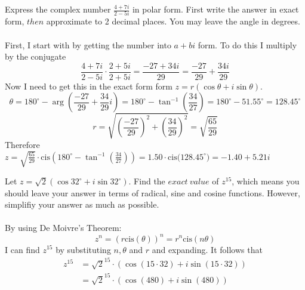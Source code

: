 \documentclass[titlepage]{article}
\newenvironment{problem}[2][Problem]{\begin{trivlist}
\item[\hskip \labelsep {\bfseries #1}\hskip \labelsep {\bfseries #2.}]}{\end{trivlist}}
\begin{document}
 
 
\fancyhf{}
\begin{problem}{1}
Express the complex number $\frac{4+7i}{2-5i}$ in polar form. First write the answer in exact form, $then$ approximate to 2 decimal places. You may leave the angle in degrees.
\\ \\
First, I start with by getting the number into $a + bi$ form.  To do this I multiply by the conjugate
$$\frac{4+7i}{2-5i} \cdot \frac{2+5i}{2+5i} = \frac{-27+34i}{29} = \frac{-27}{29} + \frac{34i}{29}$$
Now I need to get this in the exact form form $z=r(\cos{\theta} + i\sin{\theta})$. $$\theta = 180^\circ - \arg{\left(\frac{-27}{29} + \frac{34}{29}i\right)} = 180^\circ - \tan^{-1}{\left(\frac{34}{27}\right)} = 180^\circ - 51.55^\circ = 128.45^\circ $$
$$r = \sqrt{{\left(\frac{-27}{29}\right)^2} + \left(\frac{34}{29}\right)^2} = \sqrt{\frac{65}{29}}$$
Therefore $z = \sqrt{\frac{65}{29}}\cdot \text{cis}(180^\circ - \tan^{-1}{\left(\frac{34}{27}\right)}) =  1.50\cdot\text{cis}{\big(128.45^\circ\big)} = -1.40 + 5.21i$
\end{problem}
\begin{problem}{2}
Let $z=\sqrt{2}(\cos{32^\circ + i\sin{32^\circ}})$. Find the $exact \ value$ of $z^{15}$, which means you should leave your answer in terms of radical, sine and cosine functions. However, simplifiy your answer as much as possible.
\\ \\ 
By using De Moivre's Theorem:
$$z^n = (r\text{cis}(\theta))^n = r^n \text{cis}(n\theta)$$
I can find $z^{15}$ by substituting $n,\theta$ and $r$ and expanding. It follows that
\begin{align*}
z^{15} &= \sqrt{2}^{15}\cdot(\cos{(15\cdot32)} + i\sin{(15\cdot32)}) \\
&=\sqrt{2}^{15} \cdot (\cos{(480)} + i\sin{(480)})
\end{align*}
\end{problem}
\end{document}
